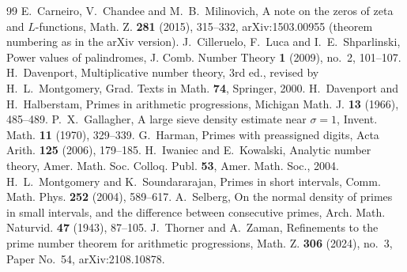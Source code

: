 \documentclass[11pt]{amsart}
\theoremstyle{definition}
\numberwithin{equation}{section}
\begin{document}
\begin{thebibliography}{99}
 E.~Carneiro, V.~Chandee and M.~B.~Milinovich, A note on the zeros of zeta and $L$-functions, Math. Z. \textbf{281} (2015), 315--332, arXiv:1503.00955 (theorem numbering as in the arXiv version).
 J.~Cilleruelo, F.~Luca and I.~E.~Shparlinski, Power values of palindromes, J. Comb. Number Theory \textbf{1} (2009), no.~2, 101--107.
 H.~Davenport, Multiplicative number theory, 3rd ed., revised by H.~L.~Montgomery, Grad. Texts in Math. \textbf{74}, Springer, 2000.
 H.~Davenport and H.~Halberstam, Primes in arithmetic progressions, Michigan Math. J. \textbf{13} (1966), 485--489.
 P.~X.~Gallagher, A large sieve density estimate near $\sigma=1$, Invent. Math. \textbf{11} (1970), 329--339.
 G.~Harman, Primes with preassigned digits, Acta Arith. \textbf{125} (2006), 179--185.
 H.~Iwaniec and E.~Kowalski, Analytic number theory, Amer. Math. Soc. Colloq. Publ. \textbf{53}, Amer. Math. Soc., 2004.
 H.~L.~Montgomery and K.~Soundararajan, Primes in short intervals, Comm. Math. Phys. \textbf{252} (2004), 589--617.
 A.~Selberg, On the normal density of primes in small intervals, and the difference between consecutive primes, Arch. Math. Naturvid. \textbf{47} (1943), 87--105.
 J.~Thorner and A.~Zaman, Refinements to the prime number theorem for arithmetic progressions, Math. Z. \textbf{306} (2024), no.~3, Paper No.~54, arXiv:2108.10878.
\end{thebibliography}
\end{document}

